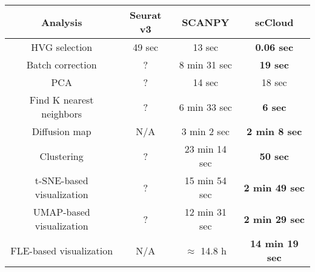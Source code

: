 \documentclass[10pt]{article}
\begin{document}
\begin{table}[H]
	\centering
	\begin{tabular}{|c|c|c|c|}
		\hline
		Analysis & Seurat v3 & SCANPY & scCloud\\
		\hline \hline
		HVG selection & 49 sec & 13 sec & \textbf{0.06 sec} \\
		\hline
		Batch correction & ? & 8 min 31 sec & \textbf{19 sec} \\
		\hline
		PCA & ? & 14 sec & 18 sec \\
		\hline
		Find K nearest neighbors &  ? &  6 min 33 sec & \textbf{6 sec}\\
		\hline
		Diffusion map & N/A & 3 min 2 sec & \textbf{2 min 8 sec} \\
		\hline 
		Clustering & ? & 23 min 14 sec & \textbf{50 sec}\\
		\hline
		t-SNE-based visualization & ? & 15 min 54 sec & \textbf{2 min 49 sec}\\
		\hline
		UMAP-based visualization & ? & 12 min 31 sec & \textbf{2 min 29 sec}\\
		\hline
		FLE-based visualization & N/A & $\approx$ 14.8  h & \textbf{14 min 19 sec}\\
		\hline
	\end{tabular}
\end{table}
\end{document}
